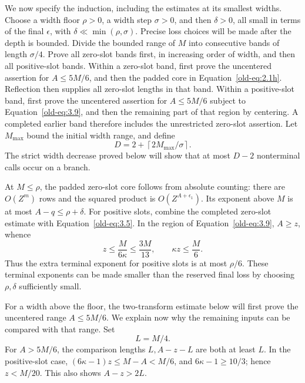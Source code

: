 \documentclass[12pt]{article}
\begin{document}
We now specify the induction, including the estimates at its smallest
widths.  Choose a width floor \(\rho>0\), a width step \(\sigma>0\),
and then \(\delta>0\), all small in terms of the final
\(\epsilon\), with \(\delta\ll\min(\rho,\sigma)\).  Precise loss
choices will be made after the depth is bounded.  Divide the bounded
range of \(M\) into consecutive bands of length \(\sigma/4\).
Prove all zero-slot bands first, in increasing order of width, and
then all positive-slot bands.  Within a zero-slot band, first prove
the uncentered assertion for \(A\le5M/6\), and then the padded core
in Equation~\eqref{old-eq:2.1h}.  Reflection then supplies all
zero-slot lengths in that band.  Within a positive-slot band, first
prove the uncentered assertion for \(A\le5M/6\) subject to
Equation~\eqref{old-eq:3.9}, and then the remaining part of that
region by centering.  A completed earlier band therefore includes
the unrestricted zero-slot assertion.  Let \(M_{\max}\) bound the
initial width range, and define
\[
 D=2+\left\lceil 2M_{\max}/\sigma\right\rceil.
\]
The strict width decrease proved below will show that at most \(D-2\)
nonterminal calls occur on a branch.

At \(M\le\rho\), the padded zero-slot core follows from absolute
counting: there are \(O(Z^m)\) rows and the squared product is
\(O(Z^{A+\epsilon_1})\).  Its exponent above \(M\) is at most
\(A-q\le\rho+\delta\).  For positive slots, combine the completed
zero-slot estimate with Equation~\eqref{old-eq:3.5}.  In the region
of Equation~\eqref{old-eq:3.9}, \(A\ge z\), whence
\begin{equation}
 z\le\frac{M}{6\kappa}\le\frac{3M}{13},
 \qquad \kappa z\le\frac M6.
 \label{old-eq:3.6}
\end{equation}
Thus the extra terminal exponent for positive slots is at most
\(\rho/6\).  These terminal exponents can be made smaller than the
reserved final loss by choosing \(\rho,\delta\) sufficiently small.

For a width above the floor, the two-transform estimate below will
first prove the uncentered range \(A\le5M/6\).  We explain now why
the remaining inputs can be compared with that range.  Set
\begin{equation}
 L=M/4.
 \label{old-eq:2.2}
\end{equation}
For \(A>5M/6\), the comparison lengths \(L,A-z-L\) are both at
least \(L\).  In the positive-slot case,
\((6\kappa-1)z\le M-A<M/6\), and \(6\kappa-1\ge10/3\); hence
\(z<M/20\).  This also shows \(A-z>2L\).
\end{document}
